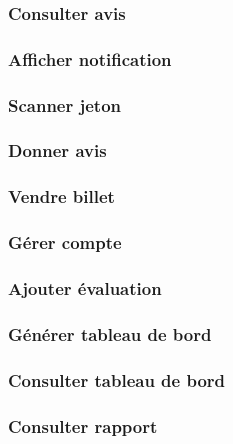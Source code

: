         \subsubsection[Consulter avis]{Consulter avis}
        \subsubsection[Afficher notification]{Afficher notification}
        \subsubsection[Scanner jeton]{Scanner jeton}
        \subsubsection[Donner avis]{Donner avis}
        \subsubsection[Vendre billet]{Vendre billet}
        \subsubsection[Gérer compte]{Gérer compte}
        \subsubsection[Ajouter évaluation]{Ajouter évaluation}
        \subsubsection[Générer tableau de bord]{Générer tableau de bord}
        \subsubsection[Consulter tableau de bord]{Consulter tableau de bord}
        \subsubsection[Consulter rapport]{Consulter rapport}